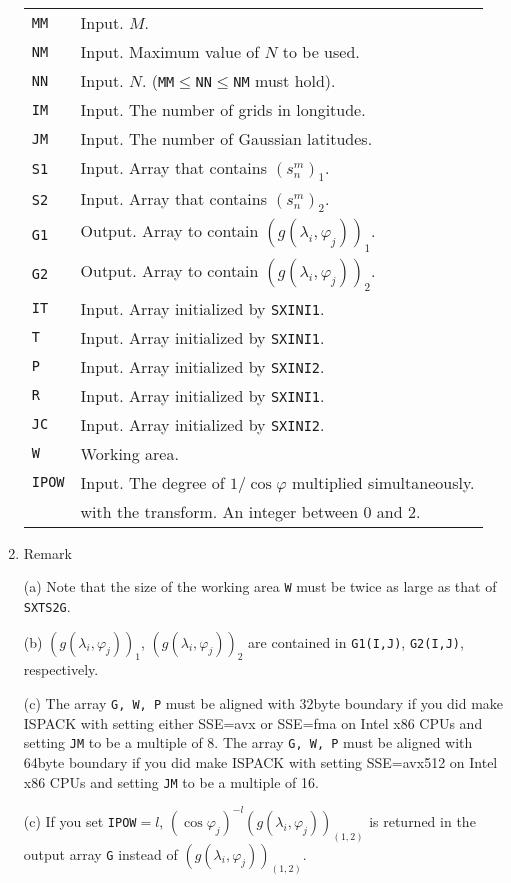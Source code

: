 \documentclass[a4paper]{scrartcl}
\begin{document}
\begin{enumerate}
\begin{tabular}{ll}
\texttt{MM} & Input. $M$.\\
\texttt{NM} & Input. Maximum value of $N$ to be used.\\
\texttt{NN} & Input. $N$. 
(\texttt{MM}$\le$\texttt{NN}$\le$\texttt{NM} must hold).\\
\texttt{IM} & Input. The number of grids in longitude.\\
\texttt{JM} & Input. The number of Gaussian latitudes.\\
\texttt{S1} & Input. Array that contains $(s^m_n)_1$.\\
\texttt{S2} & Input. Array that contains $(s^m_n)_2$.\\
\texttt{G1} & Output. Array to contain $(g(\lambda_i,\varphi_j))_1$.\\
\texttt{G2} & Output. Array to contain $(g(\lambda_i,\varphi_j))_2$.\\
\texttt{IT} & Input. Array initialized by \texttt{SXINI1}.\\
\texttt{T} & Input. Array initialized by \texttt{SXINI1}.\\
\texttt{P}  & Input. Array initialized by \texttt{SXINI2}.\\
\texttt{R}  & Input. Array initialized by \texttt{SXINI1}.\\
\texttt{JC}  & Input. Array initialized by \texttt{SXINI2}.\\
\texttt{W} & Working area.\\
\texttt{IPOW} & Input. The degree of $1/\cos\varphi$ multiplied 
simultaneously. \\
& with the transform. An integer between 0 and 2.
\end{tabular}


\item Remark

(a) Note that the size of the working area \texttt{W} must
  be twice as large as that of \texttt{SXTS2G}.

(b) $(g(\lambda_i,\varphi_j))_1$, $(g(\lambda_i,\varphi_j))_2$
  are contained in \texttt{G1(I,J)}, \texttt{G2(I,J)}, respectively.

(c) The array \texttt{G, W, P} must be aligned with 32byte boundary
if you did make ISPACK with setting either SSE=avx or SSE=fma
on Intel x86 CPUs and setting \texttt{JM} to be a multiple of 8.
The array \texttt{G, W, P} must be aligned with 64byte boundary
if you did make ISPACK with setting SSE=avx512
on Intel x86 CPUs and setting \texttt{JM} to be a multiple of 16.
  
(c) If you set \texttt{IPOW}$=l$, 
$(\cos\varphi_j)^{-l}(g(\lambda_i,\varphi_j))_{(1,2)}$ is returned 
in the output array \texttt{G} instead of $(g(\lambda_i,\varphi_j))_{(1,2)}$.

\end{enumerate}
\end{document}

